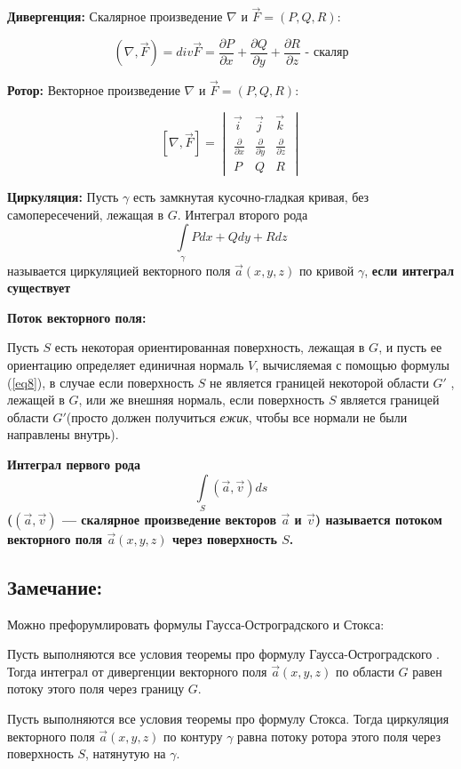 \documentclass[12pt]{article}
\begin{document}
\textbf{Дивергенция:}
	Скалярное произведение $\nabla $ и  $\vec{F}= (P , Q , R)$:
	
	$$(\nabla , \vec{F}) = div \vec{F} = \frac{\partial P}{\partial x} + \frac{\partial Q}{\partial y} + \frac{\partial R}{\partial z} \text{ - скаляр}$$ 

\textbf{Ротор:}
	Векторное произведение $\nabla $ и  $\vec{F}= (P , Q , R)$:

$$
[\nabla ,\vec{F}] = 
\begin{vmatrix}
\vec{i} & \vec{j} & \vec{k} \\
\frac{\partial}{\partial x} & \frac{\partial}{\partial y}& \frac{\partial}{\partial z} \\
P & Q & R
\end{vmatrix}
$$

\textbf{Циркуляция:}
	Пусть $\gamma$ есть замкнутая кусочно-гладкая кривая, без самопересечений,
лежащая в $G$. Интеграл второго рода 
	$$\int\limits_{\gamma} P dx + Q dy + R dz$$
называется циркуляцией векторного поля $\vec{a}(x, y, z)$ по кривой $\gamma$, \textbf{если интеграл существует}

\textbf{Поток векторного поля:}

	Пусть $S$ есть некоторая ориентированная поверхность, лежащая в $G$,
и пусть ее ориентацию определяет единичная нормаль 
$V$, вычисляемая с помощью формулы (\ref{eq8}), в случае если поверхность $S$ не является границей некоторой области $G'$
, лежащей в $G$, или же внешняя нормаль, если
поверхность $S$ является границей области $G'$(просто должен получиться \textit{ежик}, чтобы все нормали не были направлены внутрь).
 
\textbf{Интеграл первого рода}
	$$\int\limits_{S} (\vec{a} , \vec{v})ds$$
\textbf{($(\vec{a} , \vec{v})$ — скалярное произведение векторов $\vec{a}$ и $\vec{v}$) называется потоком векторного поля $\vec{a}(x, y, z)$ через поверхность $S$.}

\subsection{Замечание:}
	Можно префорумлировать формулы Гаусса-Остроградского и Стокса:
	
	Пусть выполняются все условия теоремы про формулу Гаусса-Остроградского . Тогда интеграл от дивергенции векторного поля $\vec{a}(x, y, z)$ по области $G$ равен потоку этого поля через границу $G$.


	Пусть выполняются все условия теоремы про формулу Стокса. Тогда циркуляция векторного поля $\vec{a}(x, y, z)$ по контуру $\gamma$ равна потоку ротора этого поля через поверхность $S$, натянутую на $\gamma$.
	
\end{document}
